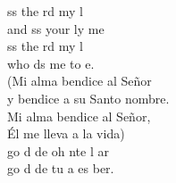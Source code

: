 \begin{cancion}%
	ss the rd my l\\
	and ss your ly me\\
	ss the rd my l\\
	who ds me to e.\\
(Mi alma bendice al Señor\\
y bendice a su Santo nombre.\\
Mi alma bendice al Señor,\\
Él me lleva a la vida)\\
	go d de  oh nte l ar\\
	go d de  tu a es ber.\\
\end{cancion}%
